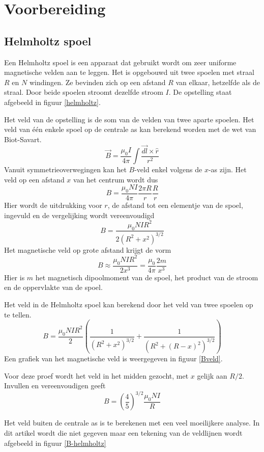 \section{Voorbereiding}
\subsection{Helmholtz spoel}

Een Helmholtz spoel is een apparaat dat gebruikt wordt om zeer uniforme 
magnetische velden aan te leggen. Het is opgebouwd uit twee spoelen met straal 
$R$ en $N$ windingen. Ze bevinden zich op een afstand $R$ van elkaar,
hetzelfde als de straal. Door beide spoelen stroomt dezelfde stroom $I$. De 
opstelling staat afgebeeld in figuur \ref{helmholtz}.


Het veld van de opstelling is de som van de velden van twee aparte spoelen. Het 
veld van \'e\'en enkele spoel op de centrale as kan berekend worden met de wet 
van Biot-Savart.
$$
\vec{B} = \frac{\mu_0 I}{4 \pi} \int \frac{\vec{dl} \times \hat{r}}{r^2}
$$
Vanuit symmetrieoverwegingen kan het $B$-veld enkel volgens de $x$-as zijn. Het 
veld op een afstand $x$ van het centrum wordt dus
$$
B = \frac{\mu_0 NI}{4 \pi} \frac{2 \pi R}{r} \frac{R}{r}
$$
Hier wordt de uitdrukking voor $r$, de afstand tot een elementje van de spoel, 
ingevuld en de vergelijking wordt vereenvoudigd
$$
B = \frac{\mu_0 NI R^2}{2(R^2+x^2)^{3/2}}
$$
Het magnetische veld op grote afstand krijgt de vorm
$$
B \approx \frac{\mu_0 NI R^2}{2x^3} = \frac{\mu_0}{4 \pi}\frac{2m}{x^3}
$$
Hier is $m$ het magnetisch dipoolmoment van de spoel, het product van de stroom 
en de oppervlakte van de spoel.

Het veld in de Helmholtz spoel kan berekend door het veld van twee spoelen op 
te tellen.
$$
B = \frac{\mu_0 NI R^2}{2}\left( \frac{1}{(R^2+x^2)^{3/2}} + 
\frac{1}{(R^2+(R-x)^2)^{3/2}} \right)
$$
Een grafiek van het magnetische veld is weergegeven in figuur \ref{Bveld}.

Voor deze proef wordt het veld in het midden gezocht, met $x$ gelijk aan $R/2$.
Invullen en vereenvoudigen geeft
$$
B = \left(\frac{4}{5}\right)^{3/2} \frac{\mu_0 NI}{R}
$$



Het veld buiten de centrale as is te berekenen met een veel moeilijkere 
analyse. In dit artikel wordt die niet gegeven maar een tekening van de 
veldlijnen wordt afgebeeld in figuur \ref{B-helmholtz}

